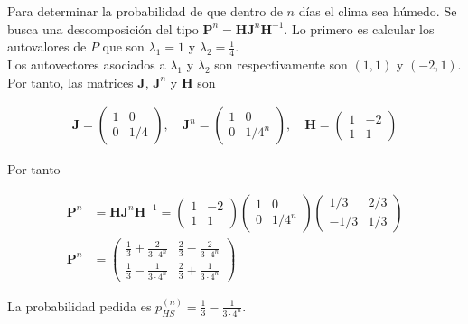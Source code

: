 \begin{ejemplo}
Para determinar la probabilidad de que dentro de $n$ días el clima sea húmedo. Se busca una descomposición del tipo $\mathbf{P}^n = \mathbf{H} \mathbf{J}^n \mathbf{H}^{-1}$. Lo primero es calcular los autovalores de $P$ que son $\lambda_1 = 1$ y $\lambda_2 = \frac{1}{4}$.\\

Los autovectores asociados a $\lambda_1$ y $\lambda_2$ son respectivamente son $(1,1)$ y $(-2,1)$.\\

Por tanto, las matrices $\mathbf{J}$, $\mathbf{J}^n$ y $\mathbf{H}$ son 

\begin{align*}
\mathbf{J} = \left( \begin{array}{cc}
1 & 0\\
0 & 1/4
\end{array} \right), 
\quad 
\mathbf{J}^n = \left( \begin{array}{cc}
1 & 0\\
0 & 1/4^n
\end{array} \right),
\quad
\mathbf{H} = \left( \begin{array}{cc}
1 & -2\\
1 & 1
\end{array} \right)
\end{align*}

Por tanto

\begin{align*}
\mathbf{P}^n & = \mathbf{H} \mathbf{J}^n \mathbf{H}^{-1} = \left( \begin{array}{cc}
1 & -2\\
1 & 1
\end{array} \right) 
\left( \begin{array}{cc}
1 & 0\\
0 & 1/4^n
\end{array} \right)
\left( \begin{array}{cc}
1/3 & 2/3\\
-1/3 & 1/3
\end{array}
\right)\\
\mathbf{P}^n & = \left(\begin{array}{cc}
\frac{1}{3} + \frac{2}{3 \cdot 4^n} & \frac{2}{3} - \frac{2}{3 \cdot 4^n} \\
\frac{1}{3} - \frac{1}{3 \cdot 4^n} & \frac{2}{3} + \frac{1}{3 \cdot 4^n}
\end{array}\right)
\end{align*}

La probabilidad pedida es $p_{HS}^{(n)} = \frac{1}{3} - \frac{1}{3 \cdot 4^n}$.

\end{ejemplo}

